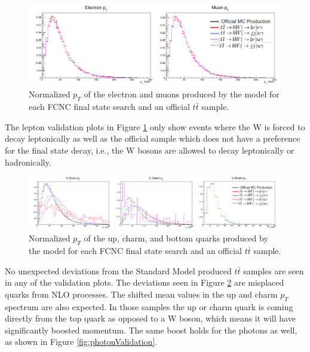\begin{figure}[h!]
	\centering
	\includegraphics[width=\columnwidth]{../ThesisImages/FCNCValidation/lepton.png}
	\caption{Normalized $p_T$ of the electron and muons produced by the model for each FCNC final state search and an official $t\bar{t}$ sample.
	}
	\label{fig:LepVal}
\end{figure} 

The lepton validation plots in Figure \ref{fig:LepVal} only show events where the W is forced to decay leptonically as well as the official sample which does not have a preference for the final state decay, i.e., the W bosons are allowed to decay leptonically or hadronically.  
\begin{figure}[h!]
	\centering
	\includegraphics[width=\columnwidth]{../ThesisImages/FCNCValidation/quarks.png}
	\caption{Normalized $p_T$ of the up, charm, and bottom quarks produced by the model for each FCNC final state search and an official $t\bar{t}$ sample.
	}
	\label{fig:QuarkVal}
\end{figure}
No unexpected deviations from the Standard Model produced $t\bar{t}$ samples are seen in any of the validation plots.  The deviations seen in Figure \ref{fig:QuarkVal} are misplaced quarks from NLO processes.  The shifted mean values in the up and charm $p_T$ spectrum are also expected.  In those samples the up or charm quark is coming directly from the top quark as opposed to a W boson, which means it will have significantly boosted momentum.  The same boost holds for the photons as well, as shown in Figure \ref{fig:photonValidation}.

